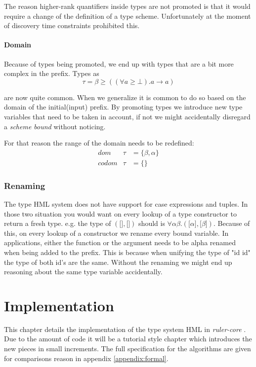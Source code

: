 \documentclass[twoside, titlepage, openright, a4paper]{book}
\renewcommand{\geq}{\geqslant}
\newcommand{\rcore}{\emph{ruler-core }}
\begin{document}
The reason higher-rank quantifiers inside types are not promoted is that it would require a change of the definition of a type scheme. Unfortunately at the moment of discovery time constraints prohibited this.
\subsubsection{Domain}
Because of types being promoted, we end up with types that are a bit more complex in the prefix. Types as 
\begin{equation}
\tau = \beta \geq ((\forall a \geq \bot). a \rightarrow a)
\end{equation}

are now quite common. When we generalize it is common to do so based on the domain of the initial(input) prefix. By promoting types we introduce new type variables that need to be taken in account, if not we might accidentally disregard a \emph{scheme bound} without noticing. 

For that reason the range of the domain needs to be redefined:
\begin{eqnarray*}
dom   &\tau& = \{\beta, \alpha\}\\
codom &\tau& = \{\}
\end{eqnarray*}

\subsection{Renaming}
\label{renaming}

The type HML system does not have support for case expressions and tuples. In those two situation you would want on every lookup of a type constructor to return a fresh type. e.g. the type of $(\lbrack \rbrack, \lbrack \rbrack)$ should is $\forall \alpha \beta . (\lbrack \alpha \rbrack, \lbrack \beta \rbrack)$. Because of this, on every lookup of a constructor we rename every bound variable. In applications, either the function or the argument needs to be alpha renamed when being added to the prefix. This is because when unifying the type of "id id" the type of both id's are the same. Without the renaming we might end up reasoning about the same type variable accidentally.

\chapter{Implementation}
\label{Implementation}
This chapter details the implementation of the type system HML in \rcore. Due to the amount of code it will be a tutorial style chapter which introduces the new pieces in small increments. The full specification for the algorithms are given for comparisons reason in appendix \ref{appendix:formal}.
\end{document}
